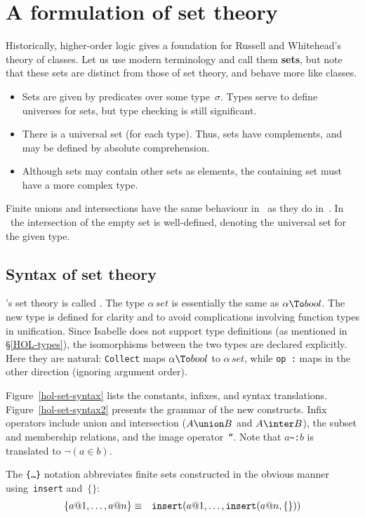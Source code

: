 \section{A formulation of set theory}
Historically, higher-order logic gives a foundation for Russell and
Whitehead's theory of classes.  Let us use modern terminology and call them
{\bf sets}, but note that these sets are distinct from those of {\ZF} set
theory, and behave more like {\ZF} classes.
\begin{itemize}
\item
Sets are given by predicates over some type~$\sigma$.  Types serve to
define universes for sets, but type checking is still significant.
\item
There is a universal set (for each type).  Thus, sets have complements, and
may be defined by absolute comprehension.
\item
Although sets may contain other sets as elements, the containing set must
have a more complex type.
\end{itemize}
Finite unions and intersections have the same behaviour in \HOL\ as they
do in~{\ZF}.  In \HOL\ the intersection of the empty set is well-defined,
denoting the universal set for the given type.


\subsection{Syntax of set theory}
\HOL's set theory is called .  The type $\alpha\,set$ is
essentially the same as $\alpha\To bool$.  The new type is defined for
clarity and to avoid complications involving function types in unification.
Since Isabelle does not support type definitions (as mentioned in
\S\ref{HOL-types}), the isomorphisms between the two types are declared
explicitly.  Here they are natural: {\tt Collect} maps $\alpha\To bool$ to
$\alpha\,set$, while \hbox{\tt op :} maps in the other direction (ignoring
argument order).

Figure~\ref{hol-set-syntax} lists the constants, infixes, and syntax
translations.  Figure~\ref{hol-set-syntax2} presents the grammar of the new
constructs.  Infix operators include union and intersection ($A\union B$
and $A\inter B$), the subset and membership relations, and the image
operator~{\tt``}\@.  Note that $a$\verb|~:|$b$ is translated to
$\neg(a\in b)$.  

The {\tt\{\ldots\}} notation abbreviates finite sets constructed in the
obvious manner using~{\tt insert} and~$\{\}$:
\begin{eqnarray*}
  \{a@1, \ldots, a@n\}  & \equiv &  
  {\tt insert}(a@1,\ldots,{\tt insert}(a@n,\{\}))
\end{eqnarray*}

